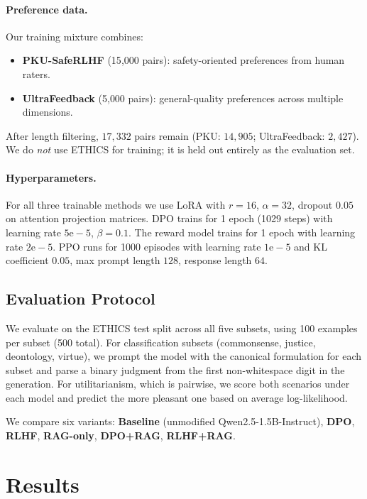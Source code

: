 \paragraph{Preference data.} Our training mixture combines:
\begin{itemize}
    \item \textbf{PKU-SafeRLHF} \citep{ji2024pku} (15{,}000 pairs): safety-oriented preferences from human raters.
    \item \textbf{UltraFeedback} \citep{cui2023ultrafeedback} (5{,}000 pairs): general-quality preferences across multiple dimensions.
\end{itemize}
After length filtering, $17{,}332$ pairs remain (PKU: $14{,}905$; UltraFeedback: $2{,}427$). We do \emph{not} use ETHICS for training; it is held out entirely as the evaluation set.

\paragraph{Hyperparameters.} For all three trainable methods we use LoRA with $r=16$, $\alpha=32$, dropout $0.05$ on attention projection matrices. DPO trains for 1 epoch (1029 steps) with learning rate $5\mathrm{e}{-}5$, $\beta=0.1$. The reward model trains for 1 epoch with learning rate $2\mathrm{e}{-}5$. PPO runs for 1000 episodes with learning rate $1\mathrm{e}{-}5$ and KL coefficient $0.05$, max prompt length $128$, response length $64$.

\subsection{Evaluation Protocol}
We evaluate on the ETHICS test split across all five subsets, using 100 examples per subset (500 total). For classification subsets (commonsense, justice, deontology, virtue), we prompt the model with the canonical formulation for each subset and parse a binary judgment from the first non-whitespace digit in the generation. For utilitarianism, which is pairwise, we score both scenarios under each model and predict the more pleasant one based on average log-likelihood.

We compare six variants:
\textbf{Baseline} (unmodified Qwen2.5-1.5B-Instruct),
\textbf{DPO}, \textbf{RLHF}, \textbf{RAG-only}, \textbf{DPO+RAG}, \textbf{RLHF+RAG}.

\section{Results}

